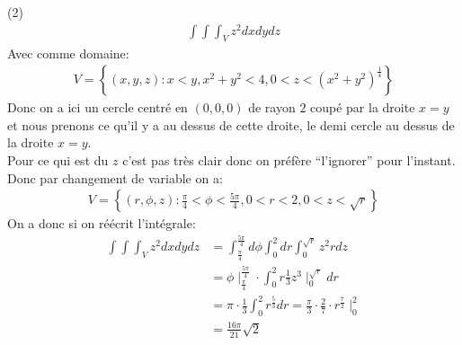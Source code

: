 \begin{parag}{(2)}
    \begin{align*} \int\int\int_V z^2 dxdydz \end{align*}
    Avec comme domaine:
    \begin{align*} V =  \left\{\left(x, y, z\right): x <y, x^2 + y^2 < 4, 0 < z < \left(x^2 + y^2\right)^{\frac{1}{4}}\right\} \end{align*}
    Donc on a ici un cercle centré en $\left(0, 0, 0\right)$ de rayon $2$ coupé par la droite $x =  y$ et nous prenons ce qu'il y a au dessus de cette droite, le demi cercle au dessus de la droite $x = y$.\\
    Pour ce qui est du $z$ c'est pas très clair donc on préfère ``l'ignorer'' pour l'instant.\\
    Donc par changement de variable on a:
    \begin{align*} 
        V =  \left\{\left(r, \phi, z\right): \frac{\pi}{4} < \phi < \frac{5\pi}{4}, 0 < r < 2, 0 < z < \sqrt{r}\right\}
    \end{align*}
    On a donc si on réécrit l'intégrale:
    \begin{align*} 
        \int\int\int_V z^2 dxdydz &= \int_{\frac{\pi}{4}}^{\frac{5\pi}{4}}d\phi \int_0^2 dr \int_0^{\sqrt{r}}z^2 r dz\\
                                  &= \phi \mid_{\frac{\pi}{4}}^{\frac{5\pi}{4}} \cdot  \int_0^2 r \frac{1}{3}z^3 \mid_0^{\sqrt{r}}dr\\
                                  &= \pi \cdot  \frac{1}{3}\int_0^2 r^{\frac{5}{3}}dr = \frac{\pi}{3}\cdot  \frac{2}{7} \cdot  r^{\frac{7}{2}}\mid_0^2\\
                                  &= \frac{16\pi}{21}\sqrt{2}
    \end{align*}
\end{parag}
